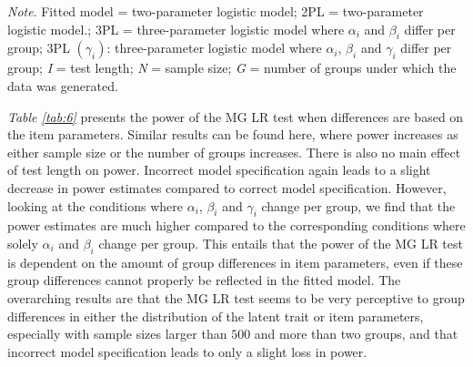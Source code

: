 \documentclass[Royal,sageapa,times,doublespace]{sagej}
\begin{document}
\begin{table}[ht!]
\bigskip
\small\textit{Note}. Fitted model = two-parameter logistic model; 2PL = two-parameter logistic model.; 3PL = three-parameter logistic model where $\alpha_i$ and $\beta_i$ differ per group; 3PL $ (\gamma_i)$: three-parameter logistic model where $\alpha_i$, $\beta_i$ and $\gamma_i$ differ per group; \textit{I} = test length; \textit{N} = sample size; \textit{G} = number of groups under which the data was generated.
\label{tab:6}
\end{table}

\indent \textit{Table \ref{tab:6}} presents the power of the MG LR test when differences are based on the item parameters. Similar results can be found here, where power increases as either sample size or the number of groups increases. There is also no main effect of test length on power. Incorrect model specification again leads to a slight decrease in power estimates compared to correct model specification. However, looking at the conditions where $\alpha_i$, $\beta_i$ and $\gamma_i$ change per group, we find that the power estimates are much higher compared to the corresponding conditions where solely $\alpha_i$ and $\beta_i$ change per group. This entails that the power of the MG LR test is dependent on the amount of group differences in item parameters, even if these group differences cannot properly be reflected in the fitted model. The overarching results are that the MG LR test seems to be very perceptive to group differences in either the distribution of the latent trait or item parameters, especially with sample sizes larger than $500$ and more than two groups, and that incorrect model specification leads to only a slight loss in power. \\
\end{document}
